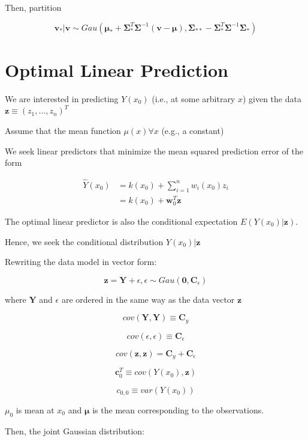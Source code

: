 \documentclass[
]{book}
\begin{document}
Then, partition

\[
\mathbf{v}_* | \mathbf{v} \sim Gau (\mathbf{\mu}_*+ \mathbf{\Sigma}^T_* \mathbf{\Sigma}^{-1} (\mathbf{v} - \mathbf{\mu}), \mathbf{\Sigma}_{**} - \mathbf{\Sigma}^T_* \mathbf{\Sigma}^{-1} \mathbf{\Sigma}_*)
\]

\hypertarget{optimal-linear-prediction}{%
\section{Optimal Linear Prediction}\label{optimal-linear-prediction}}

We are interested in predicting \(Y(x_0)\) (i.e., at some arbitrary \(x\)) given the data \(\mathbf{z} \equiv (z_1, \dots, z_n)^T\)

Assume that the mean function \(\mu(x) \forall x\) (e.g., a constant)

We seek linear predictors that minimize the mean squared prediction error of the form

\[
\begin{aligned}
\hat{Y} (x_0) &=  k(x_0) + \sum_{i=1}^n w_i (x_0) z_i \\
&= k(x_0) + \mathbf{w}^T_0 \mathbf{z}
\end{aligned}
\]

The optimal linear predictor is also the conditional expectation \(E(Y(x_0) |\mathbf{z})\).

Hence, we seek the conditional distribution \(Y(x_0) |\mathbf{z}\)

Rewriting the data model in vector form:

\[
\mathbf{z} = \mathbf{Y} + \epsilon, \epsilon \sim Gau(\mathbf{0}, \mathbf{C}_\epsilon)
\]

where \(\mathbf{Y}\) and \(\epsilon\) are ordered in the same way as the data vector \(\mathbf{z}\)

\[
cov(\mathbf{Y}, \mathbf{Y}) \equiv \mathbf{C}_y
\]

\[
cov(\epsilon,\epsilon) \equiv \mathbf{C}_\epsilon
\]

\[
cov(\mathbf{z}, \mathbf{z}) = \mathbf{C}_y + \mathbf{C}_\epsilon
\]

\[
\mathbf{c}^T_0 \equiv cov( Y(x_0), \mathbf{z})
\]

\[
c_{0,0} \equiv var(Y(x_0))
\]

\(\mu_0\) is mean at \(x_0\) and \(\mathbf{\mu}\) is the mean corresponding to the observations.

Then, the joint Gaussian distribution:
\end{document}
